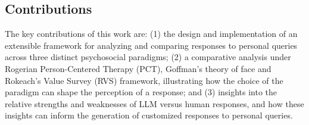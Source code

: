 \subsection{Contributions}
The key contributions of this work are: (1) the design and implementation of an extensible framework for analyzing and comparing responses to personal queries across three distinct psychosocial paradigms; (2) a comparative analysis under Rogerian Person-Centered Therapy (PCT), Goffman’s theory of face and Rokeach’s Value Survey (RVS) framework, illustrating how the choice of the paradigm can shape the perception of a response; and (3) insights into the relative strengths and weaknesses of LLM versus human responses, and how these insights can inform the generation of customized responses to personal queries.

